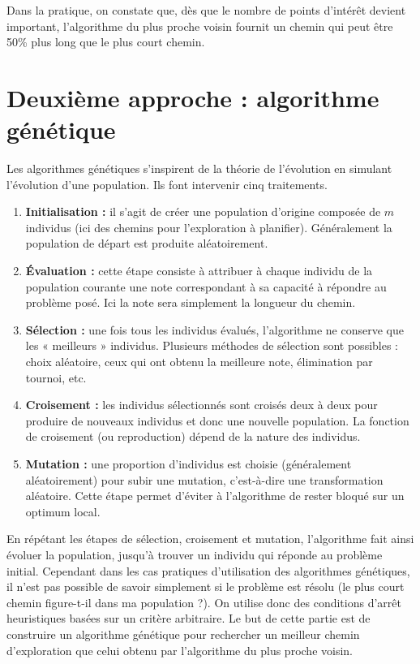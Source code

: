 Dans la pratique, on constate que, dès que le nombre de points d’intérêt devient important, l’algorithme du
plus proche voisin fournit un chemin qui peut être 50\% plus long que le plus court chemin.

\section{Deuxième approche : algorithme génétique}

Les algorithmes génétiques s’inspirent de la théorie de l’évolution en simulant l’évolution d’une population. Ils
font intervenir cinq traitements.
\begin{enumerate}
\item \textbf{Initialisation :} il s’agit de créer une population d’origine composée de $m$ individus (ici des chemins pour l’exploration à
planifier). Généralement la population de départ est produite aléatoirement.
\item \textbf{Évaluation :} cette étape consiste à attribuer à chaque individu de la population courante une note correspondant à sa
capacité à répondre au problème posé. Ici la note sera simplement la longueur du chemin.
\item \textbf{Sélection :} une fois tous les individus évalués, l’algorithme ne conserve que les « meilleurs » individus. Plusieurs méthodes
de sélection sont possibles : choix aléatoire, ceux qui ont obtenu la meilleure note, élimination par
tournoi, etc.
\item \textbf{Croisement :} les individus sélectionnés sont croisés deux à deux pour produire de nouveaux individus et donc une nouvelle
population. La fonction de croisement (ou reproduction) dépend de la nature des individus.
\item \textbf{Mutation :} une proportion d’individus est choisie (généralement aléatoirement) pour subir une mutation, c’est-à-dire
une transformation aléatoire. Cette étape permet d’éviter à l’algorithme de rester bloqué sur un optimum
local.
\end{enumerate}
En répétant les étapes de sélection, croisement et mutation, l’algorithme fait ainsi évoluer la population, jusqu’à
trouver un individu qui réponde au problème initial. Cependant dans les cas pratiques d’utilisation des
algorithmes génétiques, il n’est pas possible de savoir simplement si le problème est résolu (le plus court chemin
figure-t-il dans ma population ?). On utilise donc des conditions d’arrêt heuristiques basées sur un critère
arbitraire.
Le but de cette partie est de construire un algorithme génétique pour rechercher un meilleur chemin d’exploration
que celui obtenu par l’algorithme du plus proche voisin.


